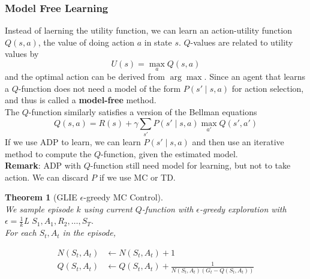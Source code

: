 \documentclass[12pt]{article}
\newtheorem{theorem}{Theorem}[section]
\theoremstyle{definition}
\begin{document}
\subsubsection{Model Free Learning}
Instead of laerning the utility function, we can learn an action-utility function $Q(s,a)$, the value of doing action $a$ in state $s$. $Q$-values are related to utility values by
\[
U(s)=\max_a Q(s,a)
\]
and the optimal action can be derived from $\arg\max$. Since an agent that learns a $Q$-function does not need a model of the form $P(s'\mid s,a)$ for action selection, and thus is called a \textbf{model-free} method.\\
The $Q$-function similarly satisfies a version of the Bellman equations
\[
Q(s,a)=R(s)+\gamma\sum_{s'}P(s'\mid s,a)\max_{a'}Q(s',a')
\]
If we use ADP to learn, we can learn $P(s'\mid s,a)$ and then use an iterative method to compute the $Q$-function, given the estimated model. \\
\textbf{Remark}: ADP with $Q$-function still need model for learning, but not to take action. We can discard $P$ if we use MC or TD.\\
\begin{theorem}[GLIE {$\epsilon$-greedy} MC Control]
\hfill\\\normalfont We sample episode $k$ using current $Q$-function with $\epsilon$-greedy exploration with $\epsilon=\frac{1}{k}$L $S_1,A_1,R_2,\ldots, S_T$.\\
For each $S_t, A_t$ in the episode,

\begin{align*}
N(S_t,A_t)&\leftarrow N(S_t,A_t)+1\\
Q(S_t,A_t)&\leftarrow Q(S_t,A_t)+\frac{1}{N(S_t,A_t)(G_t-Q(S_t,A_t))}
\end{align*}

\end{theorem}
\end{document}
